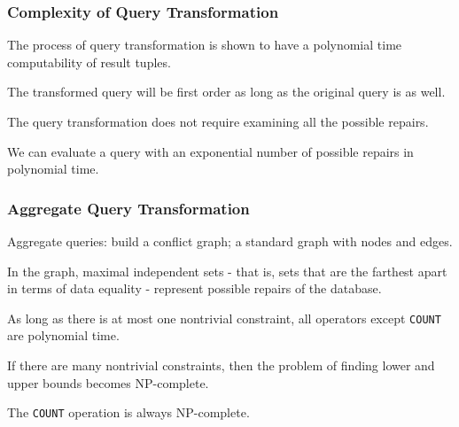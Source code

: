 \begin{frame}
\frametitle{Complexity of Query Transformation}

The process of query transformation is shown to have a polynomial time computability of result tuples. 

The transformed query will be first order as long as the original query is as well. 

The query transformation does not require examining all the possible repairs.

We can evaluate a query with an exponential number of possible repairs in polynomial time.

\end{frame}


\begin{frame}
\frametitle{Aggregate Query Transformation}

Aggregate queries: build a conflict graph; a standard graph with nodes and edges. 

In the graph, maximal independent sets - that is, sets that are the farthest apart in terms of data equality - represent possible repairs of the database. 

As long as there is at most one nontrivial constraint, all operators except \texttt{COUNT} are polynomial time.

If there are many nontrivial constraints, then the problem of finding lower and upper bounds becomes NP-complete. 

The \texttt{COUNT} operation is always NP-complete.


\end{frame}


